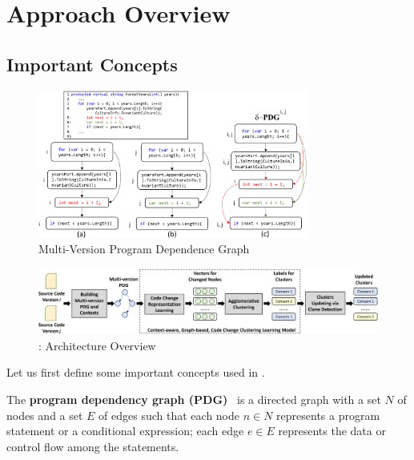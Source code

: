 \section{Approach Overview}
\label{overview:sec}

\subsection{Important Concepts}
\label{concepts:sec}

\begin{figure}[t]
	\centering
	\includegraphics[width=3.5in]{figures/multi-version-graph-3.png} %
	\vspace{-18pt}
	\caption{Multi-Version Program Dependence Graph}
	\label{fig:multi-version-pdg}
\end{figure}

\begin{figure}[t]
	\centering
 	\includegraphics[width=6in]{figures/overview-3.png}
	\vspace{-6pt}
	\caption{{\tool}: Architecture Overview}
	\label{fig:overview}
\end{figure}

Let us first define some important concepts used in {\tool}.


\begin{Definition}
The \textbf{program dependency graph (PDG)}~\cite{pdg} is a directed
graph with a set $N$ of nodes and a set $E$ of edges such that each
node $n \in N$ represents a program statement or a conditional
expression; each edge $e \in E$ represents the data or control flow
among the statements.
\end{Definition}

